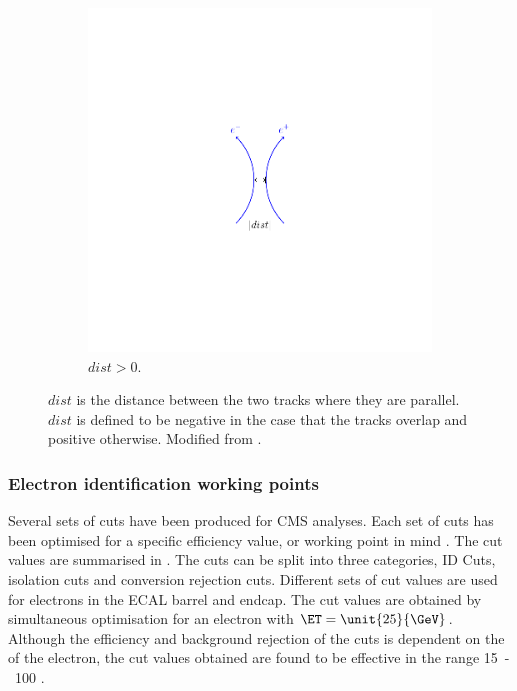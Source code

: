 \begin{figure}[htbp]
\begin{subfigure}{0.45\textwidth}
    \includegraphics[trim = 40mm 40mm 40mm 40mm, clip,width=\textwidth]{dist_p}
    \caption{$dist>0$.}
    \label{fig:dist_p}
  \end{subfigure}
  \caption{$dist$ is the distance between the two tracks where they are
parallel. $dist$ is defined to be negative in the case that the tracks overlap
and positive otherwise. Modified from \cite{barge2009conversion}. } 
\label{fig:dist}
\end{figure}

\subsubsection{Electron identification working points}

Several sets of cuts have been produced for CMS analyses. Each set of cuts has
been optimised for a specific efficiency value, or working point in mind
\cite{nikos,daskalakis2009data,simplecutbasedeleid}.  The cut values are
summarised in . The cuts can be split into three
categories, ID Cuts, isolation cuts and conversion rejection cuts. Different
sets of cut values are used for electrons in the ECAL barrel and endcap. The cut
values are obtained by simultaneous optimisation for an electron with
$\ET=\unit{25}{\GeV}$. Although the efficiency and background rejection of the
cuts is dependent on the \ET of the electron, the cut values obtained are found
to be effective in the range \unit{15-100}{\GeV} \cite{nikos,daskalakis2009data}.

